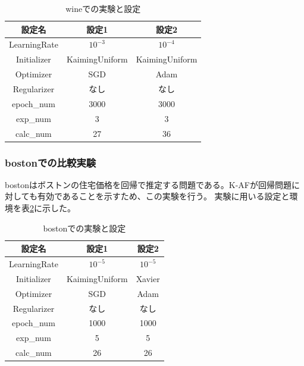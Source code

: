 \begin{table}[htbp]
    \begin{center}
        \caption{wineでの実験と設定}
        \label{exp:wine}
        \vspace{2mm} 
        \begin{tabular}{ |c|c|c| }
        \hline
        設定名 & 設定1 & 設定2 \\
        \hline
        LearningRate         & $ 10^{-3} $ & $ 10^{-4} $ \\
        \hline
        Initializer       & KaimingUniform & KaimingUniform \\
        \hline
        Optimizer           & SGD & Adam \\
        \hline
        Regularizer     & なし & なし \\
        \hline
        epoch\_num       & 3000 &  3000 \\
        \hline
        exp\_num         & 3 & 3 \\
        \hline
        calc\_num        & 27 & 36 \\
        \hline
        \end{tabular}
    \end{center}
\end{table}


\subsubsection{bostonでの比較実験}
\label{impl:boston}

bostonはボストンの住宅価格を回帰で推定する問題である。K-AFが回帰問題に対しても有効であることを示すため、この実験を行う。
実験に用いる設定と環境を表\ref{exp:boston}に示した。

\begin{table}[htbp]
    \begin{center}
        \caption{bostonでの実験と設定}
        \label{exp:boston}
        \vspace{2mm} 
        \begin{tabular}{ |c|c|c| }
        \hline
        設定名 & 設定1 & 設定2 \\
        \hline
        LearningRate         & $ 10^{-5} $ & $ 10^{-5} $ \\
        \hline
        Initializer       & KaimingUniform  & Xavier \\
        \hline
        Optimizer           & SGD & Adam \\
        \hline
        Regularizer     & なし & なし \\
        \hline
        epoch\_num       & 1000 &  1000 \\
        \hline
        exp\_num         & 5 & 5 \\
        \hline
        calc\_num        & 26 & 26 \\
        \hline
        \end{tabular}
    \end{center}
\end{table}


